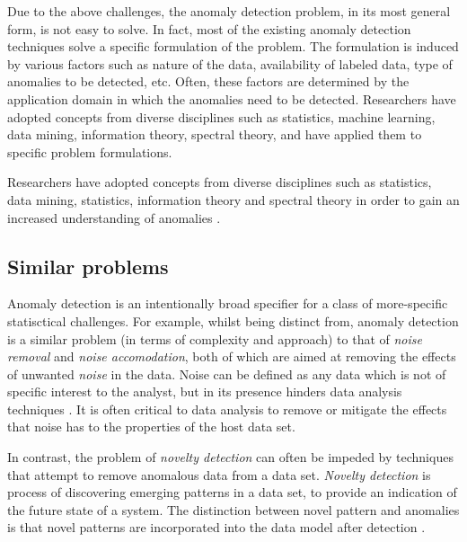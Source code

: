 Due to the above challenges, the anomaly detection problem, in its most general
form, is not easy to solve. In fact, most of the existing anomaly detection 
techniques solve a specific formulation of the problem. The formulation is 
induced by various factors such as nature of the data, availability of labeled 
data, type of anomalies to be detected, etc. Often, these factors are determined
by the application domain in which the anomalies need to be detected. 
Researchers have adopted concepts from diverse disciplines such as statistics, 
machine learning, data mining, information theory, spectral theory, and have 
applied them to specific problem formulations.

Researchers have adopted concepts from diverse disciplines such as statistics, 
data mining, statistics, information theory and spectral theory in order to gain
an increased understanding of anomalies \cite{Chandola:2007}.

\subsection{Similar problems}
\label{sec:similarProblems}
Anomaly detection is an intentionally broad specifier for a class of 
more-specific statisctical challenges. For example, whilst being distinct from, 
anomaly detection is a similar problem (in terms of complexity and approach) to 
that of \emph{noise removal} and \emph{noise accomodation}, both of which are 
aimed at removing the effects of unwanted \emph{noise} in the data. Noise can be
defined as any data which is not of specific interest to the analyst, but in its
presence hinders data analysis techniques \cite{Chandola:2007}. It is often 
critical to data analysis to remove or mitigate the effects that noise has to 
the properties of the host data set.

In contrast, the problem of \emph{novelty detection} can often be impeded by 
techniques that attempt to remove anomalous data from a data set. \emph{Novelty 
detection} is process of discovering emerging patterns in a data set, to provide
an indication of the future state of a system. The distinction between novel
pattern and anomalies is that novel patterns are incorporated into the data 
model after detection \cite{Chandola:2007}.

